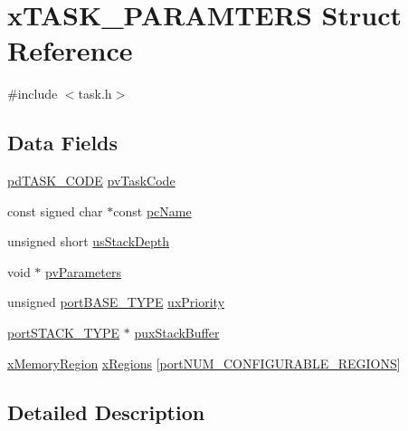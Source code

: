 \hypertarget{structxTASK__PARAMTERS}{}\section{x\+T\+A\+S\+K\+\_\+\+P\+A\+R\+A\+M\+T\+E\+RS Struct Reference}
\label{structxTASK__PARAMTERS}


{\ttfamily \#include $<$task.\+h$>$}

\subsection*{Data Fields}
\begin{DoxyCompactItemize}
\item 
\hyperlink{projdefs_8h_a6eabc3f608295fa327ba34a7d909de10}{pd\+T\+A\+S\+K\+\_\+\+C\+O\+DE} \hyperlink{structxTASK__PARAMTERS_a6cf96a364e0960bde2091fc333db4fe8}{pv\+Task\+Code}
\item 
const signed char $\ast$const \hyperlink{structxTASK__PARAMTERS_a1abd63642561418cd7c05ae24750436b}{pc\+Name}
\item 
unsigned short \hyperlink{structxTASK__PARAMTERS_a78a22fdc211362ec426d12678c6f538f}{us\+Stack\+Depth}
\item 
void $\ast$ \hyperlink{structxTASK__PARAMTERS_a658917accb7ddae9d0befcc0904eb867}{pv\+Parameters}
\item 
unsigned \hyperlink{portmacro_8h_a1ebe82d24d764ae4e352f7c3a9f92c01}{port\+B\+A\+S\+E\+\_\+\+T\+Y\+PE} \hyperlink{structxTASK__PARAMTERS_a986b666d0e341b98f5924c3531e43fc3}{ux\+Priority}
\item 
\hyperlink{portmacro_8h_ab0a294066ac7369b8f59a52d9491a92c}{port\+S\+T\+A\+C\+K\+\_\+\+T\+Y\+PE} $\ast$ \hyperlink{structxTASK__PARAMTERS_aaadcae4a91cd0a46473d9c993091f5e1}{pux\+Stack\+Buffer}
\item 
\hyperlink{task_8h_a0327ca449bbeb07a6f76456943c787dc}{x\+Memory\+Region} \hyperlink{structxTASK__PARAMTERS_a3369446f636e3d74d46d174590e244f0}{x\+Regions} \mbox{[}\hyperlink{portable_8h_aca7e1a8a568a38b74cc9db10c8efebda}{port\+N\+U\+M\+\_\+\+C\+O\+N\+F\+I\+G\+U\+R\+A\+B\+L\+E\+\_\+\+R\+E\+G\+I\+O\+NS}\mbox{]}
\end{DoxyCompactItemize}


\subsection{Detailed Description}


